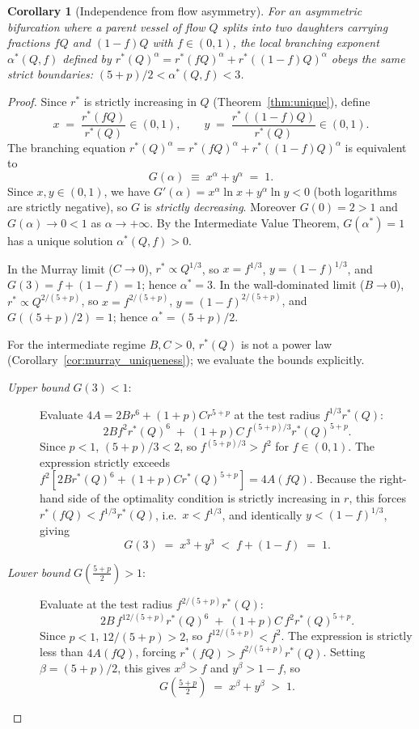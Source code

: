 \documentclass[11pt,a4paper]{article}
\newtheorem{corollary}[theorem]{Corollary}
\theoremstyle{remark}
\begin{document}
\begin{corollary}[Independence from flow asymmetry]
\label{cor:asym}
For an asymmetric bifurcation where a parent vessel of flow $Q$ splits into two
daughters carrying fractions $fQ$ and $(1-f)Q$ with $f \in (0,1)$, the local
branching exponent $\alpha^*(Q,f)$ defined by $r^*(Q)^{\alpha} =
r^*(fQ)^{\alpha} + r^*((1-f)Q)^{\alpha}$ obeys the same strict boundaries:
$(5+p)/2 < \alpha^*(Q,f) < 3$.
\end{corollary}

\begin{proof}
Since $r^*$ is strictly increasing in $Q$ (Theorem~\ref{thm:unique}), define
\[
  x \;=\; \frac{r^*(fQ)}{r^*(Q)}\in(0,1), \qquad
  y \;=\; \frac{r^*((1-f)Q)}{r^*(Q)}\in(0,1).
\]
The branching equation $r^*(Q)^\alpha = r^*(fQ)^\alpha + r^*((1-f)Q)^\alpha$ is
equivalent to
\[
  G(\alpha) \;\equiv\; x^\alpha + y^\alpha \;=\; 1.
\]
Since $x,y\in(0,1)$, we have $G'(\alpha) = x^\alpha\ln x + y^\alpha\ln y < 0$
(both logarithms are strictly negative), so $G$ is \emph{strictly decreasing}.
Moreover $G(0)=2>1$ and $G(\alpha)\to0<1$ as $\alpha\to+\infty$.
By the Intermediate Value Theorem, $G(\alpha^*)=1$ has a unique solution
$\alpha^*(Q,f)>0$.

In the Murray limit ($C\to0$), $r^*\propto Q^{1/3}$, so $x=f^{1/3}$,
$y=(1-f)^{1/3}$, and $G(3)=f+(1-f)=1$; hence $\alpha^*=3$.
In the wall-dominated limit ($B\to0$), $r^*\propto Q^{2/(5+p)}$, so
$x=f^{2/(5+p)}$, $y=(1-f)^{2/(5+p)}$, and $G((5+p)/2)=1$; hence
$\alpha^*=(5+p)/2$.

For the intermediate regime $B,C>0$, $r^*(Q)$ is not a power law
(Corollary~\ref{cor:murray_uniqueness}); we evaluate the bounds explicitly.

\begin{description}
\item[\normalfont\emph{Upper bound} $G(3)<1$:\;]
Evaluate $4A = 2Br^6+(1+p)Cr^{5+p}$ at the test radius $f^{1/3}r^*(Q)$:
\[
  2B f^2 r^*(Q)^6 \;+\; (1+p)C\, f^{(5+p)/3} r^*(Q)^{5+p}.
\]
Since $p<1$, $(5+p)/3 < 2$, so $f^{(5+p)/3} > f^2$ for $f\in(0,1)$.
The expression strictly exceeds $f^2[2Br^*(Q)^6+(1+p)Cr^*(Q)^{5+p}]=4A(fQ)$.
Because the right-hand side of the optimality condition is strictly increasing
in $r$, this forces $r^*(fQ) < f^{1/3}r^*(Q)$, i.e.\ $x<f^{1/3}$, and
identically $y<(1-f)^{1/3}$, giving
\[
  G(3) \;=\; x^3 + y^3 \;<\; f + (1-f) \;=\; 1.
\]

\item[\normalfont\emph{Lower bound} $G\!\left(\tfrac{5+p}{2}\right)>1$:\;]
Evaluate at the test radius $f^{2/(5+p)}r^*(Q)$:
\[
  2B\, f^{12/(5+p)} r^*(Q)^6 \;+\; (1+p)C\, f^2 r^*(Q)^{5+p}.
\]
Since $p<1$, $12/(5+p)>2$, so $f^{12/(5+p)}<f^2$.
The expression is strictly less than $4A(fQ)$, forcing
$r^*(fQ) > f^{2/(5+p)}r^*(Q)$.
Setting $\beta=(5+p)/2$, this gives $x^\beta > f$ and $y^\beta > 1-f$, so
\[
  G\!\left(\tfrac{5+p}{2}\right) \;=\; x^\beta + y^\beta \;>\; 1.
\]
\end{description}


\end{proof}
\end{document}
